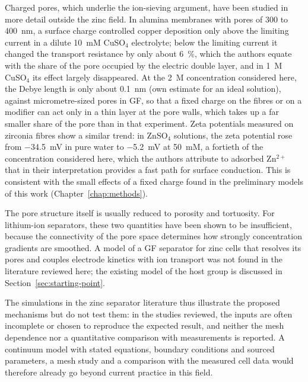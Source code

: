 Charged pores, which underlie the ion-sieving argument, have been studied in more detail outside the zinc field.
In alumina membranes with pores of 300 to \SI{400}{nm}, a surface charge controlled copper deposition only above the limiting current in a dilute \SI{10}{mM} CuSO$_4$ electrolyte; below the limiting current it changed the transport resistance by only about \SI{6}{\percent}, which the authors equate with the share of the pore occupied by the electric double layer, and in \SI{1}{M} CuSO$_4$ its effect largely disappeared\cite{han_over-limiting_2014}.
At the \SI{2}{M} concentration considered here, the Debye length is only about \SI{0.1}{nm} (own estimate for an ideal solution), against micrometre-sized pores in GF\cite{hansen_role_2023}, so that a fixed charge on the fibres or on a modifier can act only in a thin layer at the pore walls, which takes up a far smaller share of the pore than in that experiment.
Zeta potentials measured on zirconia fibres show a similar trend: in ZnSO$_4$ solutions, the zeta potential rose from \SI{-34.5}{mV} in pure water to \SI{-5.2}{mV} at \SI{50}{mM}, a fortieth of the concentration considered here, which the authors attribute to adsorbed Zn$^{2+}$ that in their interpretation provides a fast path for surface conduction\cite{cha_stable_2024}.
This is consistent with the small effects of a fixed charge found in the preliminary models of this work (Chapter~\ref{chap:methods}).

The pore structure itself is usually reduced to porosity and tortuosity.
For lithium-ion separators, these two quantities have been shown to be insufficient, because the connectivity of the pore space determines how strongly concentration gradients are smoothed\cite{lagadec_topological_2018}.
A model of a GF separator for zinc cells that resolves its pores and couples electrode kinetics with ion transport was not found in the literature reviewed here; the existing model of the host group is discussed in Section~\ref{sec:starting-point}.

The simulations in the zinc separator literature thus illustrate the proposed mechanisms but do not test them: in the studies reviewed, the inputs are often incomplete or chosen to reproduce the expected result, and neither the mesh dependence nor a quantitative comparison with measurements is reported.
A continuum model with stated equations, boundary conditions and sourced parameters, a mesh study and a comparison with the measured cell data would therefore already go beyond current practice in this field.

